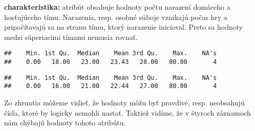 \documentclass[
]{article}
\newenvironment{Shaded}{\begin{snugshade}}{\end{snugshade}}
\newcommand{\FunctionTok}[1]{\textcolor[rgb]{0.00,0.00,0.00}{#1}}
\newcommand{\NormalTok}[1]{#1}
\newcommand{\SpecialCharTok}[1]{\textcolor[rgb]{0.00,0.00,0.00}{#1}}
\begin{document}
\textbf{charakteristika:} atribút obsahuje hodnoty počtu narazení
domáceho a hosťujúceho tímu. Narazenia, resp. osobné súboje vznikajú
počas hry a pripočítavajú sa na stranu tímu, ktorý narazenie inicioval.
Preto sa hodnoty medzi súperiacimi tímami nemusia rovnať.

\begin{Shaded}
\end{Shaded}

\begin{verbatim}
##    Min. 1st Qu.  Median    Mean 3rd Qu.    Max.    NA's 
##    0.00   18.00   23.00   23.43   28.00   80.00       4
\end{verbatim}

\begin{Shaded}
\end{Shaded}

\begin{verbatim}
##    Min. 1st Qu.  Median    Mean 3rd Qu.    Max.    NA's 
##    0.00   16.00   21.00   22.44   27.00   80.00       4
\end{verbatim}

Zo zhrnutia môžeme vidieť, že hodnoty môžu byť pravdivé, resp.
neobsahujú čísla, ktoré by logicky nemohli nastať. Taktiež vidíme, že v
štyroch záznamoch nám chýbajú hodnoty tohoto atribútu.

\begin{Shaded}
\end{Shaded}
\end{document}

